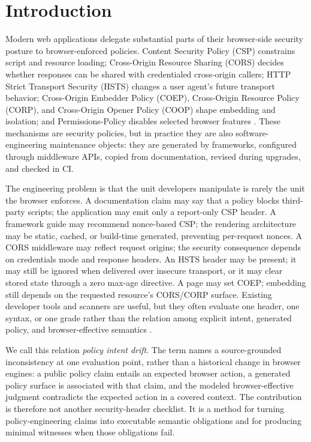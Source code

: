 \documentclass[10pt,conference]{IEEEtran}
\begin{document}
\section{Introduction}

Modern web applications delegate substantial parts of their browser-side security posture to browser-enforced policies. Content Security Policy (CSP) constrains script and resource loading; Cross-Origin Resource Sharing (CORS) decides whether responses can be shared with credentialed cross-origin callers; HTTP Strict Transport Security (HSTS) changes a user agent's future transport behavior; Cross-Origin Embedder Policy (COEP), Cross-Origin Resource Policy (CORP), and Cross-Origin Opener Policy (COOP) shape embedding and isolation; and Permissions-Policy disables selected browser features \cite{w3c_csp3_2026,whatwg_fetch_2026,rfc6797_hsts,w3c_corp_2026,whatwg_html_coop_2026,w3c_permissions_policy_2026}. These mechanisms are security policies, but in practice they are also software-engineering maintenance objects: they are generated by frameworks, configured through middleware APIs, copied from documentation, revised during upgrades, and checked in CI.

The engineering problem is that the unit developers manipulate is rarely the unit the browser enforces. A documentation claim may say that a policy blocks third-party scripts; the application may emit only a report-only CSP header. A framework guide may recommend nonce-based CSP; the rendering architecture may be static, cached, or build-time generated, preventing per-request nonces. A CORS middleware may reflect request origins; the security consequence depends on credentials mode and response headers. An HSTS header may be present; it may still be ignored when delivered over insecure transport, or it may clear stored state through a zero max-age directive. A page may set COEP; embedding still depends on the requested resource's CORS/CORP surface. Existing developer tools and scanners are useful, but they often evaluate one header, one syntax, or one grade rather than the relation among explicit intent, generated policy, and browser-effective semantics \cite{google_csp_evaluator_2026,mdn_http_observatory_2026}.

We call this relation \emph{policy intent drift}. The term names a source-grounded inconsistency at one evaluation point, rather than a historical change in browser engines: a public policy claim entails an expected browser action, a generated policy surface is associated with that claim, and the modeled browser-effective judgment contradicts the expected action in a covered context. The contribution is therefore not another security-header checklist. It is a method for turning policy-engineering claims into executable semantic obligations and for producing minimal witnesses when those obligations fail.
\end{document}
